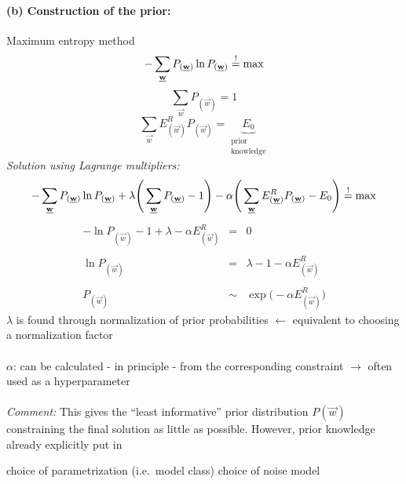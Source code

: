 \paragraph{(b) Construction of the prior:} Maximum entropy method
\begin{equation}
	-\sum\limits_{\underline{\mathbf{w}}} P_{(\underline{\mathbf{w}})} \ln P_{(\underline{\mathbf{w}})} \stackrel{\mathrm{!}}{=} \max
\end{equation}
\begin{equation}
	\sum\limits_{\vec{w}} P_{(\vec{w})} = 1
\end{equation}
\begin{equation}
	\sum\limits_{\vec{w}} E_{(\vec{w})}^R P_{(\vec{w})} 
	= \underbrace{ E_0 }_{ \substack{	\text{prior} \\
						\text{knowledge}} }
\end{equation}
\emph{Solution using Lagrange multipliers:}
\begin{equation}
	- \sum\limits_{\underline{\mathbf{w}}} P_{(\underline{\mathbf{w}})} \ln P_{(\underline{\mathbf{w}})} 
	+ \lambda \Bigg( \sum\limits_{\underline{\mathbf{w}}} P_{(\underline{\mathbf{w}})} - 1 \Bigg)
	- \alpha \Bigg( \sum\limits_{\underline{\mathbf{w}}} E_{(\underline{\mathbf{w}})}^R P_{(\underline{\mathbf{w}})}
	- E_0 \Bigg) \stackrel{\mathrm{!}}{=} \max
\end{equation}
\begin{equation}
	\begin{array}{rcl}
	- \ln P_{(\vec{w})} - 1 + \lambda - \alpha E_{(\vec{w})}^R 
	& = & 0 \\\\
	\ln P_{(\vec{w})} & = & \lambda - 1 - \alpha E_{(\vec{w})}^R \\\\
	P_{(\vec{w})} & \sim & \exp \Big( -\alpha E_{(\vec{w})}^R \Big)
	\end{array}
\label{eq:priorParameters}
\end{equation}
$\lambda$ is found through normalization of prior probabilities
$\leftarrow$ equivalent to choosing a normalization factor
\\\\
$\alpha$: can be calculated - in principle - from the corresponding
constraint $\rightarrow$ often used as a hyperparameter
\\\\
\emph{Comment:} This gives the ``least informative'' prior
distribution $P(\vec{w})$ constraining the final solution as little as
possible. However, prior knowledge already explicitly put in
\begin{itemize}
	\itl choice of parametrization (i.e.\ model class)
	\itl choice of noise model
\end{itemize}

